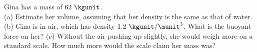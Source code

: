 Gina has a mass of $62\ \kgunit$.\\
%
(a) Estimate her volume, assuming that her
density is the same as that of water.\answercheck\hwendpart
%
(b) Gina is in air, which has density $1.2\ \kgunit/\munit^3$.
What is the buoyant force on her?\answercheck\hwendpart
%
(c) Without the air pushing up slightly, she would weigh more
on a standard scale. How much more would the scale claim her mass was?\answercheck
